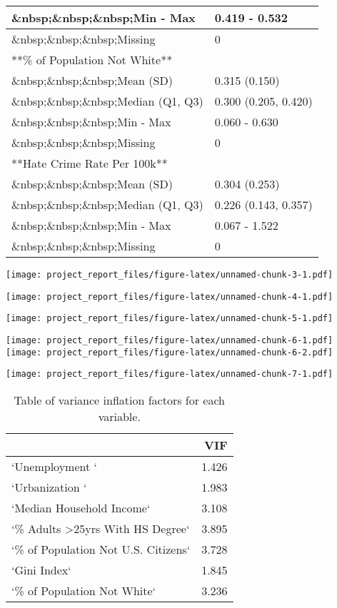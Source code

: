 \documentclass[
]{article}
\begin{document}
\begin{table}
\begin{tabular}[t]{l|l}
\hline
\&nbsp;\&nbsp;\&nbsp;Min - Max & 0.419 - 0.532\\
\hline
\&nbsp;\&nbsp;\&nbsp;Missing & 0\\
\hline
**\% of Population Not White** & \\
\hline
\&nbsp;\&nbsp;\&nbsp;Mean (SD) & 0.315 (0.150)\\
\hline
\&nbsp;\&nbsp;\&nbsp;Median (Q1, Q3) & 0.300 (0.205, 0.420)\\
\hline
\&nbsp;\&nbsp;\&nbsp;Min - Max & 0.060 - 0.630\\
\hline
\&nbsp;\&nbsp;\&nbsp;Missing & 0\\
\hline
**Hate Crime Rate Per 100k** & \\
\hline
\&nbsp;\&nbsp;\&nbsp;Mean (SD) & 0.304 (0.253)\\
\hline
\&nbsp;\&nbsp;\&nbsp;Median (Q1, Q3) & 0.226 (0.143, 0.357)\\
\hline
\&nbsp;\&nbsp;\&nbsp;Min - Max & 0.067 - 1.522\\
\hline
\&nbsp;\&nbsp;\&nbsp;Missing & 0\\
\hline
\end{tabular}
\end{table}

\texttt{[image: project\_report\_files/figure-latex/unnamed-chunk-3-1.pdf]}

\texttt{[image: project\_report\_files/figure-latex/unnamed-chunk-4-1.pdf]}

\texttt{[image: project\_report\_files/figure-latex/unnamed-chunk-5-1.pdf]}

\texttt{[image: project\_report\_files/figure-latex/unnamed-chunk-6-1.pdf]}
\texttt{[image: project\_report\_files/figure-latex/unnamed-chunk-6-2.pdf]}

\texttt{[image: project\_report\_files/figure-latex/unnamed-chunk-7-1.pdf]}

\begin{table}

\caption{\label{tab:unnamed-chunk-8}Table of variance inflation factors for each variable.}
\centering
\begin{tabular}[t]{l|r}
\hline
  & VIF\\
\hline
`Unemployment ` & 1.426\\
\hline
`Urbanization ` & 1.983\\
\hline
`Median Household Income` & 3.108\\
\hline
`\% Adults >25yrs With HS Degree` & 3.895\\
\hline
`\% of Population Not U.S. Citizens` & 3.728\\
\hline
`Gini Index` & 1.845\\
\hline
`\% of Population Not White` & 3.236\\
\hline
\end{tabular}
\end{table}
\end{document}
